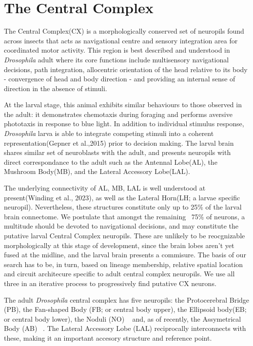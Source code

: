 \section{The Central Complex}
The Central Complex(CX) is a morphologically conserved set of neuropils found across insects
that acts as navigational centre and sensory integration area for coordinated motor activity.
This region is best described %
and understood %
in \textit{Drosophila} adult where its core functions include multisensory navigational decisions, path integration, allocentric orientation of the head relative to its body - convergence of head and body direction - and providing an internal sense of direction in the absence of stimuli. %

At the larval stage, this animal exhibits  similar behaviours to those observed in the adult: it demonstrates chemotaxis during foraging and performs aversive phototaxis in response to blue light. In addition to individual stimulus response, \textit{Drosophila} larva is able to integrate competing stimuli into a coherent representation(Gepner et al.,2015) prior to decision making. The larval brain shares similar set of neuroblasts with the adult, and presents neuropils with direct correspondance to the adult such as the Antennal Lobe(AL), the Mushroom Body(MB), and the Lateral Accessory Lobe(LAL). 

The underlying connectivity of AL, MB, LAL is well understood at present(Winding et al., 2023), as well as the Lateral Horn(LH; a larvae specific neuropil). Nevertheless, these structures constitute only up to 25\% of the larval brain connectome. We postulate that amongst the remaining ~75\% of neurons, a multitude should be devoted to navigational decisions, and may constitute the putative larval Central Complex neuropils. These are unlikely to be reocgnizable morphologically at this stage of development, since the brain lobes aren't yet fused at the midline, and the larval brain presents a commisure. The basis of our search has to be, in turn, based on lineage membership, relative spatial location and circuit architecure specific to adult central complex neuropils. We use all three in an iterative process to progressively find putative CX neurons.


The adult \textit{\textit{Drosophila}} central complex has five neuropils: the Protocerebral Bridge (PB), the Fan-shaped Body (FB; or central body upper), the Ellipsoid body(EB; or central body lower), the Noduli (NO) ~\citep{hanesch1989neuronal} and, as of recently, the Assymetrical Body (AB) ~\citep{wolff2018neuroarchitecture}. The Lateral Accessory Lobe (LAL) reciprocally interconnects with these, making it an important accesory structure and reference point. 

